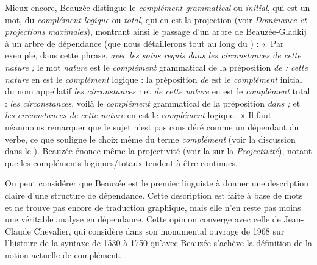 {    Mieux encore, Beauzée distingue le \textit{complément grammatical} ou \textit{initial}, qui est un mot, du \textit{complément logique} ou \textit{total}, qui en est la projection (voir  \textit{Dominance et projections maximales}), montrant ainsi le passage d’un arbre de Beauzée-Gladkij à un arbre de dépendance (que nous détaillerons tout au long du ) : «~Par exemple, dans cette phrase, \textit{avec les soins requis dans les circonstances de cette nature ;} le mot \textit{nature} est le \textit{complément} grammatical de la préposition \textit{de : cette nature} en est le \textit{complément} logique : la préposition \textit{de} est le \textit{complément} initial du nom appellatif \textit{les circonstances ;} et \textit{de cette nature} en est le \textit{complément} total : \textit{les circonstances}, voilà le \textit{complément} grammatical de la préposition \textit{dans ;} et \textit{les circonstances de cette nature} en est le \textit{complément} logique.~» Il faut néanmoins remarquer que le sujet n’est pas considéré comme un dépendant du verbe, ce que souligne le choix même du terme \textit{complément} (voir la discussion dans le ). Beauzée énonce même la projectivité (voir la  sur la \textit{Projectivité}), notant que les compléments logiques/totaux tendent à être continues.

    On peut considérer que Beauzée est le premier linguiste à donner une description claire d’une structure de dépendance. Cette description est faite à base de mots et ne trouve pas encore de traduction graphique, mais elle n’en reste pas moins une véritable analyse en dépendance. Cette opinion converge avec celle de Jean-Claude Chevalier, qui considère dans son monumental ouvrage de 1968 sur l’histoire de la syntaxe de 1530 à 1750 qu’avec Beauzée s’achève la définition de la notion actuelle de complément.

}
